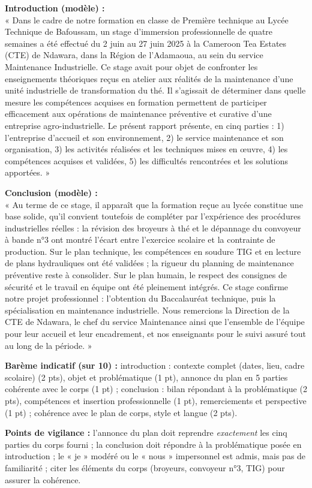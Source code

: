 \documentclass[11pt]{article}
\begin{document}
\begin{corrige}
\textbf{Introduction (modèle) :}\\
« Dans le cadre de notre formation en classe de Première technique au Lycée Technique de Bafoussam, un stage d'immersion professionnelle de quatre semaines a été effectué du 2 juin au 27 juin 2025 à la Cameroon Tea Estates (CTE) de Ndawara, dans la Région de l'Adamaoua, au sein du service Maintenance Industrielle. Ce stage avait pour objet de confronter les enseignements théoriques reçus en atelier aux réalités de la maintenance d'une unité industrielle de transformation du thé. Il s'agissait de déterminer dans quelle mesure les compétences acquises en formation permettent de participer efficacement aux opérations de maintenance préventive et curative d'une entreprise agro-industrielle. Le présent rapport présente, en cinq parties : 1) l'entreprise d'accueil et son environnement, 2) le service maintenance et son organisation, 3) les activités réalisées et les techniques mises en œuvre, 4) les compétences acquises et validées, 5) les difficultés rencontrées et les solutions apportées. »

\textbf{Conclusion (modèle) :}\\
« Au terme de ce stage, il apparaît que la formation reçue au lycée constitue une base solide, qu'il convient toutefois de compléter par l'expérience des procédures industrielles réelles : la révision des broyeurs à thé et le dépannage du convoyeur à bande n°3 ont montré l'écart entre l'exercice scolaire et la contrainte de production. Sur le plan technique, les compétences en soudure TIG et en lecture de plans hydrauliques ont été validées ; la rigueur du planning de maintenance préventive reste à consolider. Sur le plan humain, le respect des consignes de sécurité et le travail en équipe ont été pleinement intégrés. Ce stage confirme notre projet professionnel : l'obtention du Baccalauréat technique, puis la spécialisation en maintenance industrielle. Nous remercions la Direction de la CTE de Ndawara, le chef du service Maintenance ainsi que l'ensemble de l'équipe pour leur accueil et leur encadrement, et nos enseignants pour le suivi assuré tout au long de la période. »

\textbf{Barème indicatif (sur 10) :} introduction : contexte complet (dates, lieu, cadre scolaire) (2 pts), objet et problématique (1 pt), annonce du plan en 5 parties cohérente avec le corps (1 pt) ; conclusion : bilan répondant à la problématique (2 pts), compétences et insertion professionnelle (1 pt), remerciements et perspective (1 pt) ; cohérence avec le plan de corps, style et langue (2 pts).

\textbf{Points de vigilance :} l'annonce du plan doit reprendre \emph{exactement} les cinq parties du corps fourni ; la conclusion doit répondre à la problématique posée en introduction ; le « je » modéré ou le « nous » impersonnel est admis, mais pas de familiarité ; citer les éléments du corps (broyeurs, convoyeur n°3, TIG) pour assurer la cohérence.
\end{corrige}
\end{document}
